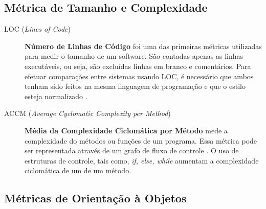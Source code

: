 \subsection{Métrica de Tamanho e Complexidade}
\label{métricas tamanho e complexidade} 
	
\begin{description}

	\item[LOC (\textit{Lines of Code})] \textbf{Número de Linhas de Código} 
	foi uma das primeiras métricas utilizadas para medir o tamanho de um 
	software. São contadas apenas as linhas executáveis, ou seja, são excluídas 
	linhas em branco e comentários. Para efetuar comparações entre sistemas 
	usando LOC, é necessário que ambos tenham sido feitos na mesma linguagem de 
	programação e que o estilo esteja normalizado \cite{Jones91}.
	
	\item[ACCM (\textit{Average Cyclomatic Complexity per Method})] \textbf{
	Média da Complexidade Ciclomática por Método} mede a complexidade do métodos
	ou funções de um programa. Essa métrica pode ser representada através de um 
	grafo de fluxo de controle \cite{McCabe76}. O uso de estruturas de controle,
	tais como, \textit{if, else, while} aumentam a complexidade ciclomática de 
	um de um método.

\end{description}




\subsection{Métricas de Orientação à Objetos}
\label{métrica objetos}

